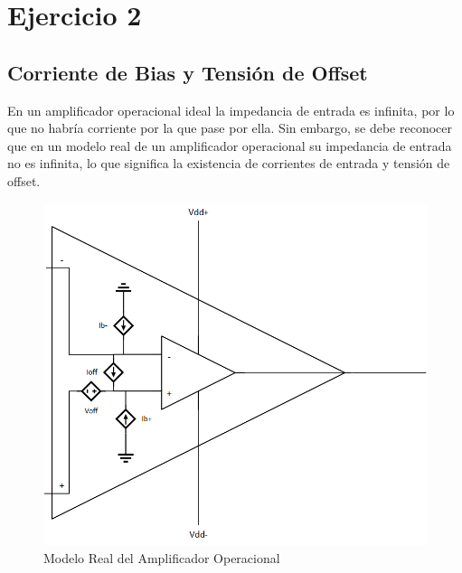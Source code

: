 \section{Ejercicio 2}

\subsection{Corriente de Bias y Tensión de Offset}

En un amplificador operacional ideal la impedancia de entrada es infinita, por lo que no habría corriente por la que pase por ella. Sin embargo, se debe reconocer que en un modelo real de un amplificador operacional su impedancia de entrada no es infinita, lo que significa la existencia de corrientes de entrada y tensión de offset. 

\begin{figure}[h]
    \centering
    \includegraphics[scale = 0.4]{modeloopamp.png}
    \caption{Modelo Real del Amplificador Operacional}
    \label{ej2opamp}
\end{figure}

